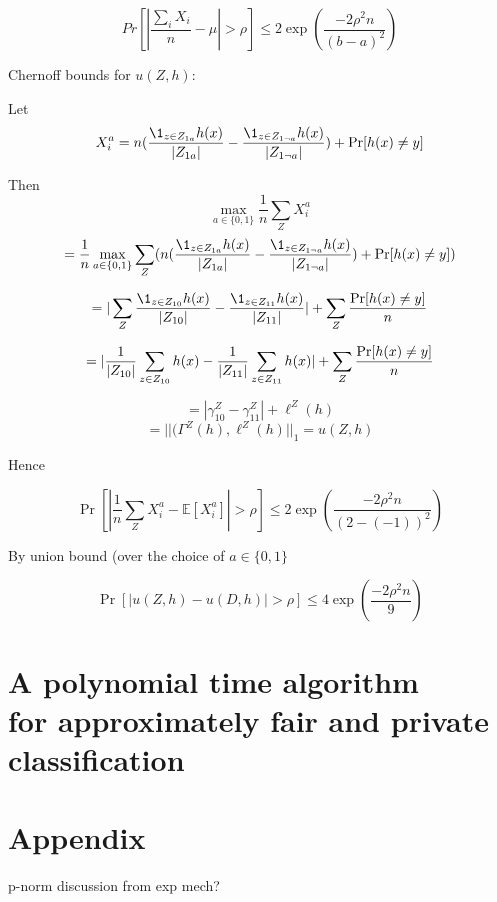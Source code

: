 $$Pr[|\frac{\sum_i X_i}{n} - \mu| > \rho] \leq 2\exp(\frac{-2\rho^2n}{(b-a)^2})$$

Chernoff bounds for $u(Z,h)$:

Let $$X_i^a = n(\frac{\1_{z\in Z_{1a}}h(x)}{|Z_{1a}|} - \frac{\1_{z\in
Z_{1\neg a}}h(x)}{|Z_{1 \neg a}|} ) + \Pr[h(x) \neq y]$$

Then $$\max_{a\in \{0,1\}}\frac{1}{n} \sum_Z X_i^a$$
$$ =\frac{1}{n}
\max_{a\in \{0,1\}} \sum_Z (n(\frac{\1_{z\in Z_{1a}}h(x)}{|Z_{1a}|} -
\frac{\1_{z\in Z_{1\neg a}}h(x)}{|Z_{1 \neg a}|} ) + \Pr[h(x) \neq y])$$

$$= |\sum_Z \frac{\1_{z\in \z{10}}h(x)}{|\z{10}|} - \frac{\1_{z\in
Z_{11}}h(x)}{|Z_{11}|}| +  \sum_Z \frac{\Pr[h(x) \neq y] }{n}$$

$$= |\frac{1}{|Z_{10}|} \sum_{z\in Z_{10}} h(x) - \frac{1}{|Z_{11}|} \sum_{z\in Z_{11}} h(x)| +  \sum_Z \frac{\Pr[h(x) \neq y] }{n}$$

$$=|\gamma_{10}^Z - \gamma_{11}^Z| + \ell^Z(h) $$
$$=||(\Gamma^Z(h), \ell^Z(h)||_{1} = u(Z,h)$$

Hence

$$\Pr[|\frac{1}{n} \sum_Z X_i^a - \mathbb{E}[X_i^a]| > \rho] \leq 2\exp(\frac{-2\rho^2n}{(2-(-1))^2})$$

By union bound (over the choice of $a \in \{0,1\}$

$$\Pr[|u(Z,h) - u(D,h)| > \rho] \leq 4\exp(\frac{-2\rho^2n}{9})$$


\section{A polynomial time algorithm \\for approximately fair and private classification}

\section{Appendix}
p-norm discussion from exp mech?